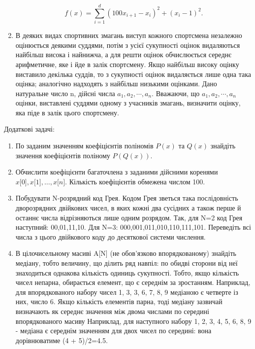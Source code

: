 \documentclass[]{article}
\begin{document}
\begin{enumerate}
  $$ f(x) = \sum\limits_{i=1}^{d} (100x_{i+1} -x_{i})^{2} + (x_{i}-1)^2. $$  

\item
  В деяких видах спортивних змагань виступ кожного спортсмена незалежно
  оцінюється деякими суддями, потім з усієї сукупності оцінок
  видаляються найбільш висока і найнижча, а для решти оцінок
  обчислюється середнє арифметичне, яке і йде в залік спортсмену. Якщо
  найбільш високу оцінку виставило декілька суддів, то з сукупності
  оцінок видаляється лише одна така оцінка; аналогічно надходять з
  найбільш низькими оцінками. Дано натуральне число n, дійсні числа
  \(a_{1},a_{2},\cdots,a_{n}\). Вважаючи, що
  \(a_{1},a_{2},\cdots,a_{n}\)оцінки, виставлені суддями одному з
  учасників змагань, визначити оцінку, яка піде в залік цього
  спортсмену.
\end{enumerate}

Додаткові задачі:

\begin{enumerate}
\def\labelenumi{\arabic{enumi})}
\setcounter{enumi}{17}
\item
По заданим значенням коефіцієнтів поліномів $P(x)$ та $Q(x)$ знайдіть
значення коефіцієнтів поліному $P(Q(x))$.
\item
  Обчислити коефіцієнти багаточлена з заданими дійсними коренями 
$ x{[}0{]},x{[}1{]}, \ldots{}, x{[}n{]}$. Кількість коефіцієнтів обмежена
  числом 100.
\item
  Побудувати N-розрядний код Грея. Кодом Грея зветься така послідовність
  дворозрядних двійкових чисел, в яких кожні два сусідних а також перше
  й останнє числа відрізняються лише одним розрядом. Так, для N=2 код
  Грея наступний: 00,01,11,10. Для N=3: 000,001,011,010,110,111,101.
  Переведіть всі числа з цього двійкового коду до десяткової системи
  числення.
\item
  В цілочисельному масиві A{[}N{]} (не обов'язково впорядкованому)
  знайдіть медіану, тобто величину, що ділить ряд навпіл: по обидві
  сторони від неї знаходиться однакова кількість одиниць сукупності.
  Тобто, якщо кількість чисел непарна, обирається елемент, що є середнім
  за зростанням. Наприклад, для впорядкованого набору чисел 1, 3, 3, 6,
  7, 8, 9 медіаною є четверте із них, число 6. Якщо кількість елементів
  парна, тоді медіану зазвичай визначають як середнє значення між двома
  числами по середині впорядкованого масиву Наприклад, для наступного
  набору 1, 2, 3, 4, 5, 6, 8, 9 - медіана є середнім значенням для двох
  чисел по середині: вона дорівнюватиме (4 + 5)/2=4.5.
\end{enumerate}
\end{document}
